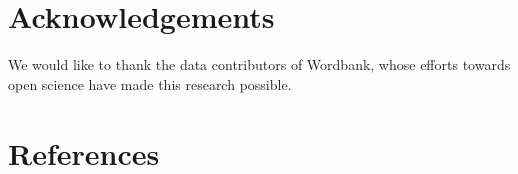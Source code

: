 \documentclass[10pt, letterpaper]{article}
\begin{document}
\newpage

\section{Acknowledgements}\label{acknowledgements}

We would like to thank the data contributors of Wordbank, whose efforts
towards open science have made this research possible.

\section{References}\label{references}

\setlength{\parindent}{-0.1in} 
\setlength{\leftskip}{0.125in}

\noindent

\label{refs}
\end{document}
